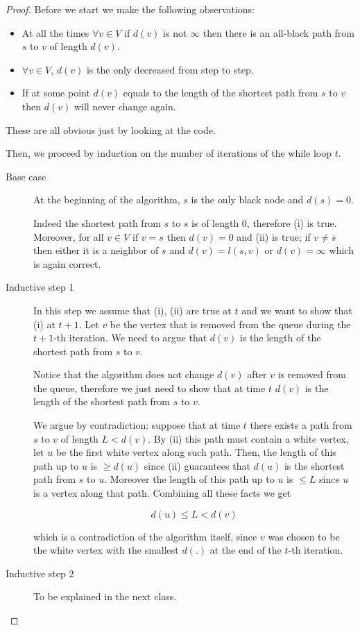\documentclass[10pt]{extarticle}
\begin{document}
\begin{proof}
    Before we start we make the following observations:
    \begin{itemize}
        \item At all the times $\forall v \in V$ if $d(v)$ is not $\infty$ then there is an all-black path from $s$ to $v$ of length $d(v)$.
        \item $\forall v \in V$, $d(v)$ is the only decreased from step to step.
        \item If at some point $d(v)$ equals to the length of the shortest path from $s$ to $v$ then $d(v)$ will never change again.
    \end{itemize}
    These are all obvious just by looking at the code.

    Then, we proceed by induction on the number of iterations of the while loop $t$.

    \begin{description}
        \item[Base case]
            At the beginning of the algorithm, $s$ is the only black node and $d(s) = 0$.

            Indeed the shortest path from $s$ to $s$ is of length 0, therefore (i) is true.
            Moreover, for all $v \in V$ if $v = s$ then $d(v) = 0$ and (ii) is true; if $v \neq s$ then either it is a neighbor of $s$ and $d(v) = l(s, v)$ or $d(v) = \infty$ which is again correct.

        \item[Inductive step 1]
            In this step we assume that (i), (ii) are true at $t$ and we want to show that (i) at $t+1$.
            Let $v$ be the vertex that is removed from the queue during the $t+1$-th iteration. We need to argue that $d(v)$ is the length of the shortest path from $s$ to $v$.

            Notice that the algorithm does not  change $d(v)$ after $v$ is removed from the queue, therefore we just need to show that at time $t$ $d(v)$ is the length of the shortest path from $s$ to $v$.

            We argue by contradiction: suppose that at time $t$ there exists a path from $s$ to $v$ of length $L < d(v)$. By (ii) this path must contain a white vertex, let $u$ be the first white vertex along such path. Then, the length of this path up to $u$ is $\geq d(u)$ since (ii) guarantees that $d(u)$ is the shortest path from $s$ to $u$.
            Moreover the length of this path up to $u$ is $\leq L$ since $u$ is a vertex along that path.
            Combining all these facts we get

            $$
                d(u) \leq L < d(v)
            $$

            which is a contradiction of the algorithm itself, since $v$ was chosen to be the white vertex with the smallest $d(.)$ at the end of the $t$-th iteration.

        \item[Inductive step 2] To be explained in the next class.
    \end{description}
\end{proof}
\end{document}
